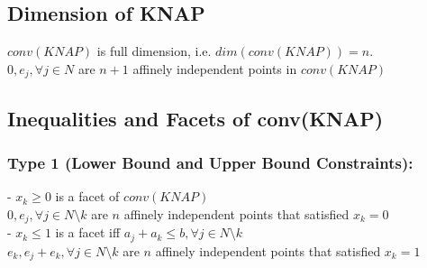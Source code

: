 			\subsection{Dimension of KNAP}
				$conv(KNAP)$ is full dimension, i.e. $dim(conv(KNAP))=n$.\\
				 $0, e_j, \forall j\in N$ are $n + 1$ affinely independent points in $conv(KNAP)$\\

			\subsection{Inequalities and Facets of conv(KNAP)}
				\subsubsection{Type 1 (Lower Bound and Upper Bound Constraints):}
					- $x_k\ge 0$ is a facet of $conv(KNAP)$\\
					 $0, e_j, \forall j\in N\setminus k$ are $n$ affinely independent points that satisfied $x_k=0$\\
					- $x_k\le 1$ is a facet iff $a_j + a_k \le b, \forall j\in N \setminus k$\\
					 $e_k, e_j+e_k, \forall j \in N\setminus k$ are $n$ affinely independent points that satisfied $x_k = 1$

